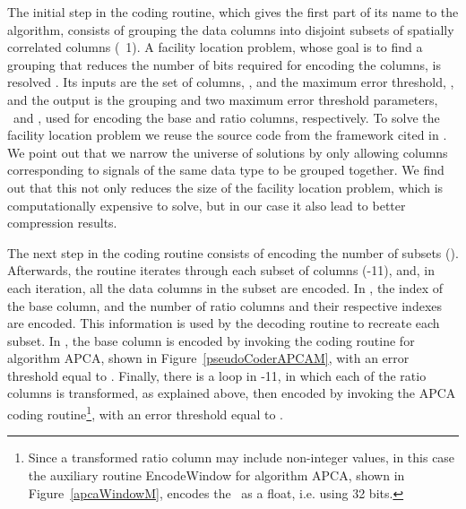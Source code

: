\vspace{-5pt}



\clearpage


The initial step in the coding routine, which gives the first part of its name to the algorithm, consists of grouping the data columns into disjoint subsets of spatially correlated columns (\Line~1). A facility location problem, whose goal is to find a grouping that reduces the number of bits required for encoding the columns, is resolved \cite{coder:gamps}. Its inputs are the set of columns, \columns, and the maximum error threshold, \maxerror, and the output is the grouping and two maximum error threshold parameters, \epsilonB\ and \epsilonR, used for encoding the base and ratio columns, respectively. To solve the facility location problem we reuse the source code from the framework cited in \cite{AnEva2013}. We point out that we narrow the universe of solutions by only allowing columns corresponding to signals of the same data type to be grouped together. We find out that this not only reduces the size of the facility location problem, which is computationally expensive to solve, but in our case it also lead to better compression results. 


The next step in the coding routine consists of encoding the number of subsets (). Afterwards, the routine iterates through each subset of columns (-11), and, in each iteration, all the data columns in the subset are encoded. In , the index of the base column, and the number of ratio columns and their respective indexes are encoded. This information is used by the decoding routine to recreate each subset. In , the base column is encoded by invoking the coding routine for algorithm APCA, shown in Figure~\ref{pseudoCoderAPCAM}, with an error threshold equal to \epsilonB. Finally, there is a loop in -11, in which each of the ratio columns is transformed, as explained above, then encoded by invoking the APCA coding routine\footnote{Since a transformed ratio column may include non-integer values, in this case the auxiliary routine EncodeWindow for algorithm APCA, shown in Figure~\ref{apcaWindowM}, encodes the \midrange\ as a float, i.e. using 32 bits.}, with an error threshold equal to \epsilonR.




